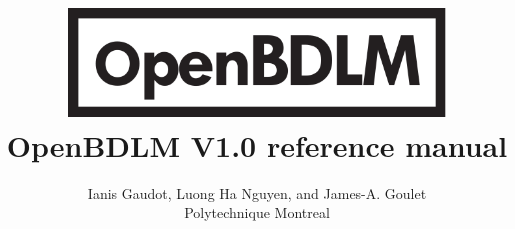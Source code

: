 \documentclass[11pt,twoside]{article}
\title{\includegraphics[width=100mm]{OpenBDLM_logo.pdf}\\[20pt]
 OpenBDLM V1.0 reference manual}
\author{Ianis Gaudot, Luong Ha Nguyen, and James-A. Goulet \\ Polytechnique Montreal}
\newcounter{question}
\begin{document}
\newcommand{\MATLAB}{\textsc{Matlab}}


\newcommand\Que[1]{%
   \leavevmode\par
   \stepcounter{question}
   \noindent
   \thequestion. Q --- #1\par}

\newcommand\Ans[2][]{%
    \leavevmode\par\noindent
   {\leftskip37pt
    A --- \textbf{#1}#2\par}}


\maketitle

\tableofcontents
\newpage



























\end{document}
